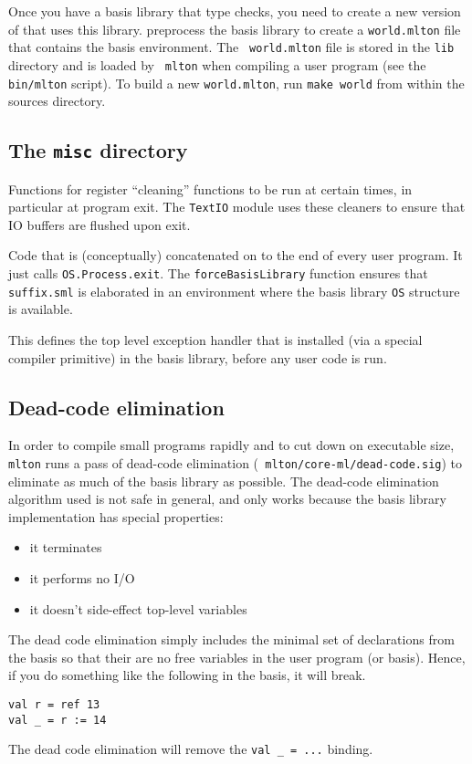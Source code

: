 Once you have a basis library that type checks, you need to create a new version
of {\mlton} that uses this library.  {\mlton} preprocess the basis library to
create a {\tt world.mlton} file that contains the basis environment.  The {\tt
world.mlton} file is stored in the {\tt lib} directory and is loaded by {\tt
mlton} when compiling a user program (see the {\tt bin/mlton} script).  To build
a new {\tt world.mlton}, run {\tt make world} from within the sources directory.

\subsection{The {\tt misc} directory}

\begin{description}

Functions for register ``cleaning'' functions to be run at certain times, in
particular at program exit.  The {\tt TextIO} module uses these cleaners to
ensure that IO buffers are flushed upon exit.

Code that is (conceptually) concatenated on to the end of every user program.
It just calls {\tt OS.Process.exit}.  The {\tt forceBasisLibrary} function
ensures that {\tt suffix.sml} is elaborated in an environment where the basis
library {\tt OS} structure is available.

This defines the top level exception handler that is installed (via a special
compiler primitive) in the basis library, before any user code is run.

\end{description}

\subsection{Dead-code elimination}

In order to compile small programs rapidly and to cut down on executable size,
{\tt mlton} runs a pass of dead-code elimination ({\tt
mlton/core-ml/dead-code.sig}) to eliminate as much of the basis library as
possible.  The dead-code elimination algorithm used is not safe in general, and
only works because the basis library implementation has special properties:
\begin{itemize}
\item it terminates
\item it performs no I/O
\item it doesn't side-effect top-level variables
\end{itemize}
The dead code elimination simply includes the minimal set of
declarations from the basis so that their are no free variables in the
user program (or basis).  Hence, if you do something like the
following in the basis, it will break.
\begin{verbatim}
val r = ref 13
val _ = r := 14
\end{verbatim}
The dead code elimination will remove the {\tt val \_ = ...} binding.
